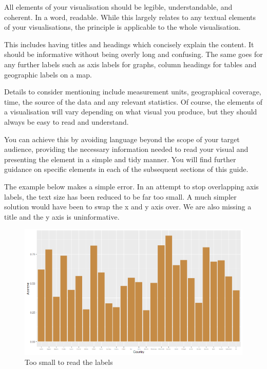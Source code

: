 \documentclass[
  titlepage]{book}
\begin{document}
All elements of your visualisation should be legible, understandable, and coherent. In a word, readable. While this largely relates to any textual elements of your visualisations, the principle is applicable to the whole visualisation.

This includes having titles and headings which concisely explain the content. It should be informative without being overly long and confusing. The same goes for any further labels such as axis labels for graphs, column headings for tables and geographic labels on a map.

Details to consider mentioning include measurement units, geographical coverage, time, the source of the data and any relevant statistics.
Of course, the elements of a visualisation will vary depending on what visual you produce, but they should always be easy to read and understand.

You can achieve this by avoiding language beyond the scope of your target audience, providing the necessary information needed to read your visual and presenting the element in a simple and tidy manner. You will find further guidance on specific elements in each of the subsequent sections of this guide.

The example below makes a simple error. In an attempt to stop overlapping axis labels, the text size has been reduced to be far too small. A much simpler solution would have been to swap the x and y axis over. We are also missing a title and the y axis is uninformative.

\begin{figure}
\centering
\includegraphics{img/bar chart poor.png}
\caption{Too small to read the labels}
\end{figure}
\end{document}
